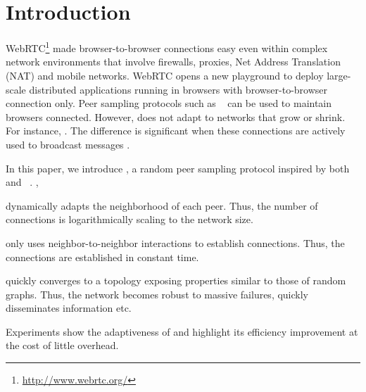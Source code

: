 
\section{Introduction}


WebRTC\footnote{\url{http://www.webrtc.org/}} made browser-to-browser
connections easy even within complex network environments that involve firewalls,
proxies, Net Address Translation (NAT) and mobile networks. WebRTC opens a new
playground to deploy large-scale distributed applications running in browsers
with browser-to-browser connection only. Peer sampling protocols such as
\CYCLON~\cite{voulgaris2005cyclon} can be used to maintain browsers connected.
However, \CYCLON does not adapt to networks that grow or shrink.
For instance,
. The difference is significant when
these connections are actively used to broadcast messages .

In this paper, we introduce \SPRAY, a random peer sampling protocol inspired by
both \SCAMP~\cite{ganesh2003peer}
and \CYCLON~\cite{voulgaris2005cyclon}. ,
\begin{inparaenum}[(i)]
\item \SPRAY dynamically adapts the neighborhood of each peer. Thus, the number
  of connections is logarithmically scaling to the network size.
\item \SPRAY only uses neighbor-to-neighbor interactions to establish
  connections. Thus, the connections are established in constant time.
\item \SPRAY quickly converges to a topology exposing properties similar to
  those of random graphs. Thus, the network becomes robust to massive failures,
  quickly disseminates information etc.
\item Experiments show the adaptiveness of \SPRAY and highlight its efficiency
  improvement at the cost of little overhead.
\end{inparaenum}

